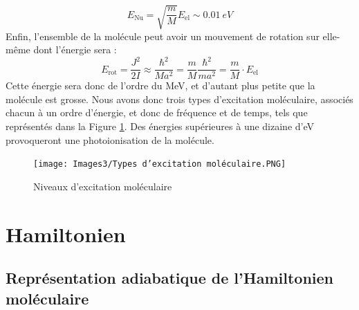 \[
    E_\text{Nu} = \sqrt{\dfrac{m}{M}}E_\text{el} \sim \SI{0.01}{eV}
\]
Enfin, l'ensemble de la molécule peut avoir un mouvement de rotation sur elle-même dont l'énergie sera :
\[
    E_\text{rot} = \dfrac{J^2}{2I} \approx \dfrac{\hbar^2}{Ma^2} = \dfrac{m}{M}\dfrac{\hbar^2}{ma^2} = \dfrac{m}{M}\cdot E_\text{el}
\]
Cette énergie sera donc de l'ordre du \si{MeV}, et d'autant plus petite que la molécule est grosse. Nous avons donc trois types d'excitation moléculaire, associés chacun à un ordre d'énergie, et donc de fréquence et de temps, tels que représentés dans la Figure \ref{fig:niv_excitation_mol}. Des énergies supérieures à une dizaine d'\si{eV} provoqueront une photoionisation de la molécule.


\begin{figure}[htpb]
    \centering
    \texttt{[image: Images3/Types d'excitation moléculaire.PNG]}
    \caption{Niveaux d'excitation moléculaire}
    \label{fig:niv_excitation_mol}
\end{figure}



\section{Hamiltonien}
\subsection{Représentation adiabatique de l'Hamiltonien moléculaire}


